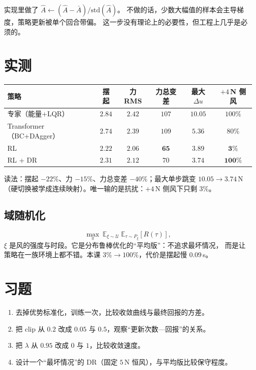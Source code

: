 实现里做了 $\hat A\leftarrow(\hat A-\bar A)/\mathrm{std}(\hat A)$。
不做的话，少数大幅值的样本会主导梯度，策略更新被单个回合带偏。
这一步没有理论上的必要性，但工程上几乎是必须的。

\section{实测}

\begin{center}\small
\begin{tabular}{@{}lccccc@{}}
\toprule
策略 & 摆起 & 力 RMS & 力总变差 & 最大 $\Delta u$ & $+4$\,N 侧风 \\
\midrule
专家（能量+LQR） & $2.84$ & $2.42$ & $107$ & $10.05$ & $100\%$ \\
Transformer（BC+DAgger） & $2.74$ & $2.39$ & $109$ & $5.36$ & $80\%$ \\
RL & $\mathbf{2.22}$ & $\mathbf{2.06}$ & $\mathbf{65}$ & $3.89$ & $\mathbf{3\%}$ \\
RL + DR & $2.31$ & $2.12$ & $70$ & $\mathbf{3.74}$ & $\mathbf{100\%}$ \\
\bottomrule
\end{tabular}
\end{center}

读法：摆起 $-22\%$、力 $-15\%$、力总变差 $-40\%$；最大单步跳变 $10.05\to3.74$\,N
（硬切换被学成连续映射）。唯一输的是抗扰：$+4$\,N 侧风下只剩 $3\%$。

\subsection{域随机化}

\begin{equation}
  \max_\pi\ \mathbb{E}_{\xi\sim\mathcal{U}}\ \mathbb{E}_{\tau\sim P_\xi}[R(\tau)],
\end{equation}
$\xi$ 是风的强度与时段。它是分布鲁棒优化的“平均版”：不追求最坏情况，
而是让策略在一族环境上都不错。本课 $3\%\to100\%$，代价是摆起慢 $0.09$\,s。


\section{习题}
\begin{enumerate}[leftmargin=1.6em,itemsep=4pt]
  \item 去掉优势标准化，训练一次，比较收敛曲线与最终回报的方差。
  \item 把 clip 从 $0.2$ 改成 $0.05$ 与 $0.5$，观察“更新次数—回报”的关系。
  \item 把 $\lambda$ 从 $0.95$ 改成 $0$ 与 $1$，比较收敛速度。
  \item 设计一个“最坏情况”的 DR（固定 $5$\,N 恒风），与平均版比较保守程度。
\end{enumerate}
